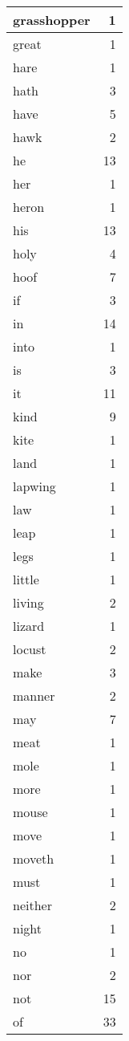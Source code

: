 \begin{center}
\begin{longtable}{l|r}
grasshopper & 1 \\ \hline
great & 1 \\ \hline
hare & 1 \\ \hline
hath & 3 \\ \hline
have & 5 \\ \hline
hawk & 2 \\ \hline
he & 13 \\ \hline
her & 1 \\ \hline
heron & 1 \\ \hline
his & 13 \\ \hline
holy & 4 \\ \hline
hoof & 7 \\ \hline
if & 3 \\ \hline
in & 14 \\ \hline
into & 1 \\ \hline
is & 3 \\ \hline
it & 11 \\ \hline
kind & 9 \\ \hline
kite & 1 \\ \hline
land & 1 \\ \hline
lapwing & 1 \\ \hline
law & 1 \\ \hline
leap & 1 \\ \hline
legs & 1 \\ \hline
little & 1 \\ \hline
living & 2 \\ \hline
lizard & 1 \\ \hline
locust & 2 \\ \hline
make & 3 \\ \hline
manner & 2 \\ \hline
may & 7 \\ \hline
meat & 1 \\ \hline
mole & 1 \\ \hline
more & 1 \\ \hline
mouse & 1 \\ \hline
move & 1 \\ \hline
moveth & 1 \\ \hline
must & 1 \\ \hline
neither & 2 \\ \hline
night & 1 \\ \hline
no & 1 \\ \hline
nor & 2 \\ \hline
not & 15 \\ \hline
of & 33 \\ \hline

\end{longtable}
\end{center}
